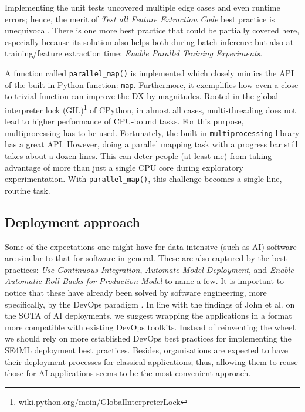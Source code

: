Implementing the unit tests uncovered multiple edge cases and even runtime errors; hence, the merit of \textit{Test all Feature Extraction Code} best practice is unequivocal. There is one more best practice that could be partially covered here, especially because its solution also helps both during batch inference but also at training/feature extraction time: \textit{Enable Parallel Training Experiments}.

A function called \texttt{parallel\_map()} is implemented which closely mimics the API of the built-in Python function: \texttt{map}. Furthermore, it exemplifies how even a close to trivial function can improve the DX by magnitudes. Rooted in the global interpreter lock (GIL)\footnote{\href{https://wiki.python.org/moin/GlobalInterpreterLock}{wiki.python.org/moin/GlobalInterpreterLock}} of CPython, in almost all cases, multi-threading does not lead to higher performance of CPU-bound tasks. For this purpose, multiprocessing has to be used. Fortunately, the built-in \texttt{multiprocessing} library has a great API. However, doing a parallel mapping task with a progress bar still takes about a dozen lines. This can deter people (at least me) from taking advantage of more than just a single CPU core during exploratory experimentation. With \texttt{parallel\_map()}, this challenge becomes a single-line, routine task. 

\subsection{Deployment approach}

Some of the expectations one might have for data-intensive (such as AI) software are similar to that for software in general. These are also captured by the best practices: \textit{Use Continuous Integration}, \textit{Automate Model Deployment}, and \textit{Enable Automatic Roll Backs for Production Model} to name a few. It is important to notice that these have already been solved by software engineering, more specifically, by the DevOps paradigm \cite{leite2019survey}. 
In line with the findings of John et al. \cite{john2020architecting} on the SOTA of AI deployments, we suggest wrapping the applications in a format more compatible with existing DevOps toolkits. Instead of reinventing the wheel, we should rely on more established DevOps best practices for implementing the SE4ML deployment best practices. Besides, organisations are expected to have their deployment processes for classical applications; thus, allowing them to reuse those for AI applications seems to be the most convenient approach.


